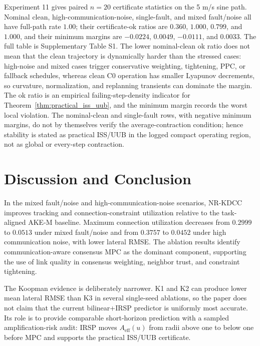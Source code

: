 \documentclass[twocolumn,3p,times,procedia]{elsarticle}
\newcommand{\AKE}{AKE-M}
\newcommand{\Method}{NR-KDCC}
\begin{document}
Experiment 11 gives paired $n=20$ certificate statistics on the 5 m/s sine path. Nominal clean, high-communication-noise, single-fault, and mixed fault/noise all have full-path rate $1.00$; their certificate-ok ratios are $0.360$, $1.000$, $0.799$, and $1.000$, and their minimum margins are $-0.0224$, $0.0049$, $-0.0111$, and $0.0033$. The full table is Supplementary Table S1. The lower nominal-clean ok ratio does not mean that the clean trajectory is dynamically harder than the stressed cases: high-noise and mixed cases trigger conservative weighting, tightening, PPC, or fallback schedules, whereas clean C0 operation has smaller Lyapunov decrements, so curvature, normalization, and replanning transients can dominate the margin. The ok ratio is an empirical failing-step-density indicator for Theorem~\ref{thm:practical_iss_uub}, and the minimum margin records the worst local violation. The nominal-clean and single-fault rows, with negative minimum margins, do not by themselves verify the average-contraction condition; hence stability is stated as practical ISS/UUB in the logged compact operating region, not as global or every-step contraction.

\FloatBarrier

\section{Discussion and Conclusion}

In the mixed fault/noise and high-communication-noise scenarios, \Method{} improves tracking and connection-constraint utilization relative to the task-aligned \AKE{} baseline. Maximum connection utilization decreases from $0.2999$ to $0.0513$ under mixed fault/noise and from $0.3757$ to $0.0452$ under high communication noise, with lower lateral RMSE. The ablation results identify communication-aware consensus MPC as the dominant component, supporting the use of link quality in consensus weighting, neighbor trust, and constraint tightening.

The Koopman evidence is deliberately narrower. K1 and K2 can produce lower mean lateral RMSE than K3 in several single-seed ablations, so the paper does not claim that the current bilinear+IRSP predictor is uniformly most accurate. Its role is to provide comparable short-horizon prediction with a sampled amplification-risk audit: IRSP moves $A_{\mathrm{eff}}(u)$ from radii above one to below one before MPC and supports the practical ISS/UUB certificate.
\end{document}
